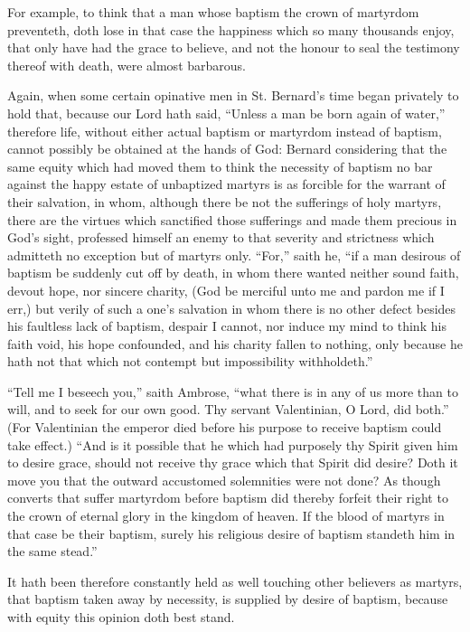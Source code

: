 For example, to think that a man whose baptism the crown of martyrdom preventeth, doth lose in that case the happiness which so many thousands enjoy, that only have had the grace to believe, and not the honour to seal the testimony thereof with death, were almost barbarous.

Again, when some certain opinative men in St. Bernard’s time began privately to hold that, because our Lord hath said, “Unless a man be born again of water,” therefore life, without either actual baptism or martyrdom instead of baptism, cannot possibly be obtained at the hands of God: Bernard considering that the same equity which had moved them to think the necessity of baptism no bar against the happy estate of unbaptized martyrs is as forcible for the warrant of their salvation, in whom, although there be not the sufferings of holy martyrs, there are the virtues which sanctified those sufferings and made them precious in God’s sight, professed himself an enemy to that severity and strictness which admitteth no exception but of martyrs only. “For,” saith he,  “if a man desirous of baptism be suddenly cut off by death,
 in whom there wanted neither sound faith, devout hope, nor sincere charity, (God be merciful unto me and pardon me if I err,) but verily of such a one’s salvation in whom there is no other defect besides his faultless lack of baptism, despair I cannot, nor induce my mind to think his faith void, his hope confounded, and his charity fallen to nothing, only because he hath not that which not contempt but impossibility withholdeth.”

“Tell me I beseech you,” saith Ambrose, “what there is in any of us more than to will, and to seek for our own good. Thy servant Valentinian, O Lord, did both.” (For Valentinian the emperor died before his purpose to receive baptism could take effect.) “And is it possible that he which had purposely thy Spirit given him to desire grace, should not receive thy grace which that Spirit did desire? Doth it move you that the outward accustomed solemnities were not done? As though converts that suffer martyrdom before baptism did thereby forfeit their right to the crown of eternal glory in the kingdom of heaven. If the blood of martyrs in that case be their baptism, surely his religious desire of baptism standeth him in the same stead.”

It hath been therefore constantly held as well touching other believers as martyrs, that baptism taken away by necessity, is supplied by desire of baptism, because with equity this opinion doth best stand.

